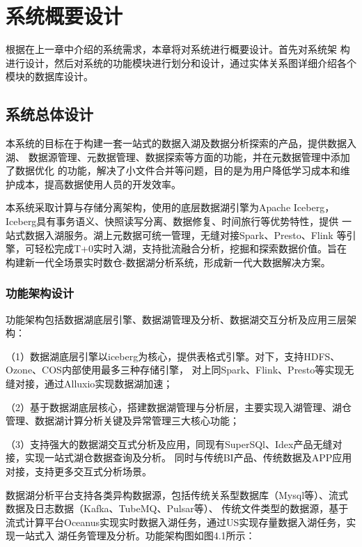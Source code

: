 
\chapter{系统概要设计}

根据在上一章中介绍的系统需求，本章将对系统进行概要设计。首先对系统架
构进行设计，然后对系统的功能模块进行划分和设计，通过实体关系图详细介绍各个模块的数据库设计。

\section{系统总体设计}

本系统的目标在于构建一套一站式的数据入湖及数据分析探索的产品，提供数据入湖、
数据源管理、元数据管理、数据探索等方面的功能，并在元数据管理中添加了数据优化
的功能，解决了小文件合并等问题，目的是为用户降低学习成本和维护成本，提高数据使用人员的开发效率。

本系统采取计算与存储分离架构，使用的底层数据湖引擎为Apache Iceberg，
Iceberg具有事务语义、快照读写分离、数据修复、时间旅行等优势特性，提供
一站式数据入湖服务。湖上元数据可统一管理，无缝对接Spark、Presto、Flink
等引擎，可轻松完成T+0实时入湖，支持批流融合分析，挖掘和探索数据价值。旨在
构建新一代全场景实时数仓-数据湖分析系统，形成新一代大数据解决方案。

\subsection{功能架构设计}

功能架构包括数据湖底层引擎、数据湖管理及分析、数据湖交互分析及应用三层架构：

（1）数据湖底层引擎以iceberg为核心，提供表格式引擎。对下，支持HDFS、Ozone、COS内部使用最多三种存储引擎，
对上同Spark、Flink、Presto等实现无缝对接，通过Alluxio实现数据湖加速；

（2）基于数据湖底层核心，搭建数据湖管理与分析层，主要实现入湖管理、湖仓管理、数据湖计算分析关键及异常管理三大核心功能；

（3）支持强大的数据湖交互式分析及应用，同现有SuperSQl、Idex产品无缝对接，实现一站式湖仓数据查询及分析。
同时与传统BI产品、传统数据及APP应用对接，支持更多交互式分析场景。

数据湖分析平台支持各类异构数据源，包括传统关系型数据库（Mysql等）、流式数据及日志数据（Kafka、TubeMQ、Pulsar等）、
传统文件类型的数据源，基于流式计算平台Oceanus实现实时数据入湖任务，通过US实现存量数据入湖任务，实现一站式入
湖任务管理及分析。功能架构图如图4.1所示：

